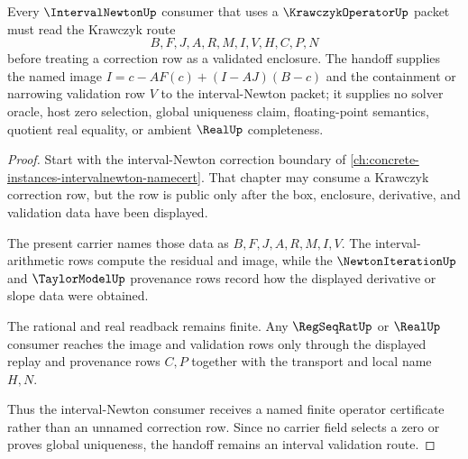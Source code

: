 \begin{theorem}
\label{thm:krawczyk-operator-interval-newton-handoff}
Every $\IntervalNewtonUp$ consumer that uses a $\KrawczykOperatorUp$ packet must read the Krawczyk route
$$
B,F,J,A,R,M,I,V,H,C,P,N
$$
before treating a correction row as a validated enclosure. The handoff supplies the named image $I=c-AF(c)+(I-AJ)(B-c)$ and the containment or narrowing validation row $V$ to the interval-Newton packet; it supplies no solver oracle, host zero selection, global uniqueness claim, floating-point semantics, quotient real equality, or ambient $\RealUp$ completeness.
\end{theorem}
\begin{proof}
Start with the interval-Newton correction boundary of \autoref{ch:concrete-instances-intervalnewton-namecert}. That chapter may consume a Krawczyk correction row, but the row is public only after the box, enclosure, derivative, and validation data have been displayed.

The present carrier names those data as $B,F,J,A,R,M,I,V$. The interval-arithmetic rows compute the residual and image, while the $\NewtonIterationUp$ and $\TaylorModelUp$ provenance rows record how the displayed derivative or slope data were obtained.

The rational and real readback remains finite. Any $\RegSeqRatUp$ or $\RealUp$ consumer reaches the image and validation rows only through the displayed replay and provenance rows $C,P$ together with the transport and local name $H,N$.

Thus the interval-Newton consumer receives a named finite operator certificate rather than an unnamed correction row. Since no carrier field selects a zero or proves global uniqueness, the handoff remains an interval validation route.
\end{proof}



